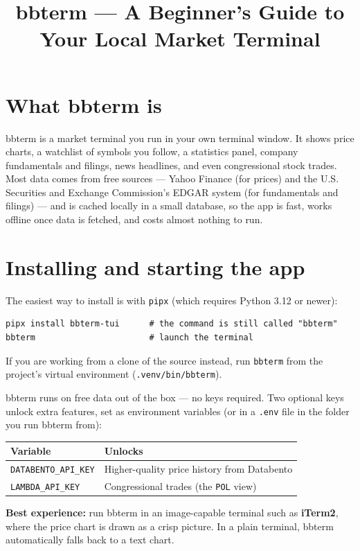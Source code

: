 \documentclass[11pt]{article}
\title{bbterm --- A Beginner's Guide to Your Local Market Terminal}
\author{}
\date{}
\begin{document}
\maketitle
\tableofcontents

\section{What bbterm is}
bbterm is a market terminal you run in your own terminal window. It shows price
charts, a watchlist of symbols you follow, a statistics panel, company
fundamentals and filings, news headlines, and even congressional stock trades.
Most data comes from free sources --- Yahoo Finance (for prices) and the U.S.
Securities and Exchange Commission's EDGAR system (for fundamentals and filings)
--- and is cached locally in a small database, so the app is fast, works offline
once data is fetched, and costs almost nothing to run.

\section{Installing and starting the app}
The easiest way to install is with \texttt{pipx} (which requires Python 3.12 or
newer):
\begin{Verbatim}[frame=single]
pipx install bbterm-tui      # the command is still called "bbterm"
bbterm                       # launch the terminal
\end{Verbatim}
If you are working from a clone of the source instead, run \texttt{bbterm} from
the project's virtual environment (\texttt{.venv/bin/bbterm}).

bbterm runs on free data out of the box --- no keys required. Two optional keys
unlock extra features, set as environment variables (or in a \texttt{.env} file
in the folder you run bbterm from):
\begin{center}
\begin{tabular}{ll}
\toprule
Variable & Unlocks \\
\midrule
\texttt{DATABENTO\_API\_KEY} & Higher-quality price history from Databento \\
\texttt{LAMBDA\_API\_KEY} & Congressional trades (the \texttt{POL} view) \\
\bottomrule
\end{tabular}
\end{center}

\textbf{Best experience:} run bbterm in an image-capable terminal such as
\textbf{iTerm2}, where the price chart is drawn as a crisp picture. In a plain
terminal, bbterm automatically falls back to a text chart.
\end{document}
